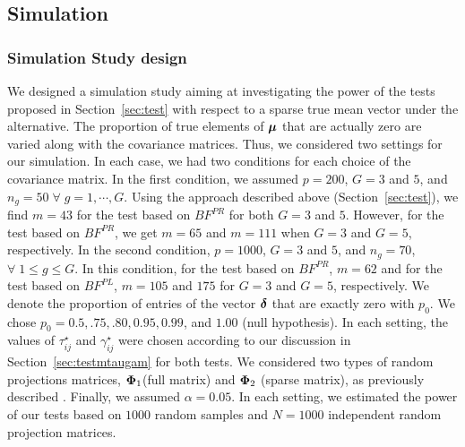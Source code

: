 \documentclass[times,sort&compress,3p]{elsarticle}
\theoremstyle{plain}%
\theoremstyle{definition}
\newcommand{\udelta}            {\mbox{\boldmath$\delta$}}
\newcommand{\umu}               {\mbox{\boldmath$\mu$}}
\newcommand{\uPhi}              {\mbox{\boldmath$\Phi$}}
\begin{document}
\subsection{Simulation}

\subsubsection{Simulation Study design}
We designed a simulation study aiming at investigating the power of the tests proposed in Section~\ref{sec:test}
with respect to a sparse true mean vector under the alternative. The proportion of true elements of $\umu$ that are actually zero are varied along with the covariance matrices.
Thus, we considered two settings for our simulation. In each case, we had two conditions for each choice of the covariance matrix. 
In the first condition, we assumed $p = 200$, $G=3$ and $5$, and $n_g = 50\;\forall\; g =  1, \cdots, G$. Using the approach described above (Section~\ref{sec:test}), we find $m = 43$ for the test based on $BF^{PR}_{}$ for both $G=3$ and $5$. However, for the test based on $BF^{PR}$, we get $m = 65$ and $m = 111$ when $G=3$ and $G=5$, respectively. In the second condition, $p = 1000$, $G=3$ and $5$, and $n_g = 70$, $\forall\; 1 \leq g \leq G$. In this condition, for the test based on $BF^{PR}_{}$, $m = 62$ and for the test based on $BF^{PL}_{}$, $m = 105$ and $175$ for $G=3$ and $G=5$, respectively. We denote the proportion of entries of the vector $\udelta$ that are exactly zero with $p_0$. We chose $p_0 = 0.5, .75, .80, 0.95, 0.99$, and $1.00$ (null hypothesis). In each setting, the values of $\tau^{\star}_{ij}$ and $\gamma^{\star}_{ij}$ were chosen according to our discussion in Section~\ref{sec:testmtaugam} for both tests. We considered two types of random projections matrices, $\uPhi_{1}$(full matrix)  and $\uPhi_2$ (sparse matrix), as previously described \cite{srivastava2014raptt,zoh2018powerful}. Finally, we assumed $\alpha = 0.05$. In each setting, we estimated the power of our tests based on $1000$ random samples and $N = 1000$ independent random projection matrices.
\end{document}
